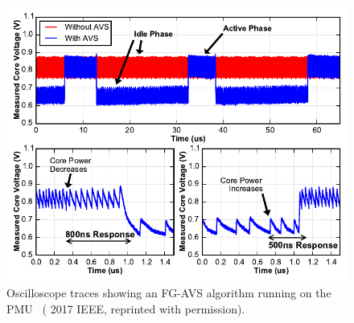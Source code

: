 \documentclass[graybox]{svmult}
\begin{document}
\begin{figure}
  \centering
  \includegraphics[width=\textwidth]{6-raven4-avs}
  \caption{Oscilloscope traces showing an FG-AVS algorithm running on the PMU~\cite{Keller2017} ({\textcopyright} 2017 IEEE, reprinted with permission).}
  \label{fig:6-raven4-avs}
\end{figure}
\end{document}
